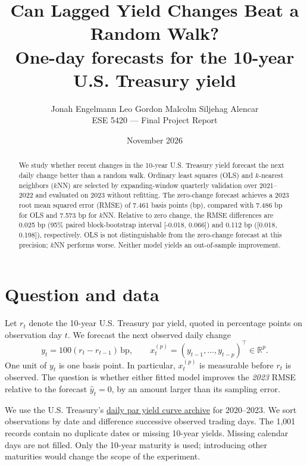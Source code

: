 \documentclass[10pt,letterpaper]{article}
\title{\vspace{-2em}\textbf{Can Lagged Yield Changes Beat a Random Walk?}\\[2mm]
\large One-day forecasts for the 10-year U.S. Treasury yield}
\author{Jonah Engelmann \qquad Leo Gordon \qquad Malcolm Siljehag Alencar\\
\normalsize ESE 5420 --- Final Project Report}
\date{November 2026}
\newcommand{\bp}{\,\mathrm{bp}}
\begin{document}
\maketitle
\vspace{-1.25em}
\begin{abstract}
We study whether recent changes in the 10-year U.S. Treasury yield forecast the next daily change better than a random walk. Ordinary least squares (OLS) and $k$-nearest neighbors ($k$NN) are selected by expanding-window quarterly validation over 2021--2022 and evaluated on 2023 without refitting. The zero-change forecast achieves a 2023 root mean squared error (RMSE) of 7.461 basis points (bp), compared with 7.486 bp for OLS and 7.573 bp for $k$NN. Relative to zero change, the RMSE differences are 0.025 bp (95\% paired block-bootstrap interval [-0.018, 0.066]) and 0.112 bp ([0.018, 0.198]), respectively. OLS is not distinguishable from the zero-change forecast at this precision; $k$NN performs worse. Neither model yields an out-of-sample improvement.
\end{abstract}

\section{Question and data}
Let $r_t$ denote the 10-year U.S. Treasury par yield, quoted in percentage points on observation day $t$. We forecast the next observed daily change
\begin{equation}
    y_t=100(r_t-r_{t-1})\bp,
    \qquad x_t^{(p)}=(y_{t-1},\ldots,y_{t-p})^\top\in\mathbb R^p.
    \label{eq:features}
\end{equation}
One unit of $y_t$ is one basis point. In particular, $x_t^{(p)}$ is measurable before $r_t$ is observed. The question is whether either fitted model improves the \emph{2023} RMSE relative to the forecast $\widehat y_t=0$, by an amount larger than its sampling error.

We use the U.S. Treasury's \href{https://home.treasury.gov/resource-center/data-chart-center/interest-rates/daily-treasury-rate-archives/par-yield-curve-rates-2020-2023.csv}{daily par yield curve archive} for 2020--2023. We sort observations by date and difference successive observed trading days. The 1,001 records contain no duplicate dates or missing 10-year yields. Missing calendar days are not filled. Only the 10-year maturity is used; introducing other maturities would change the scope of the experiment.
\end{document}
